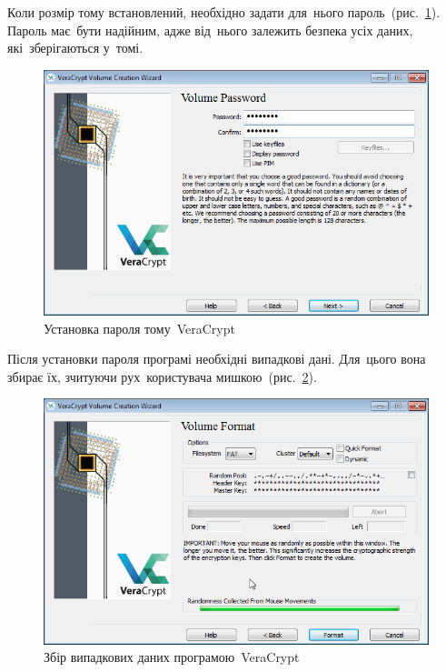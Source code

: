 \documentclass[
	a4paper,
	oneside,
	BCOR = 10mm,
	DIV = 12,
	12pt,
	headings = normal,
]{scrartcl}
\begin{document}
		Коли розмір тому встановлений, необхідно задати для~нього пароль~(рис.~\ref{fig:vc-vol-password}). Пароль має~бути надійним, адже від~нього залежить безпека усіх даних, які~зберігаються у~томі.

		\begin{figure}[!htbp]
			\centering
			\includegraphics[height = 10 \baselineskip]{./assets/07.png}
			\caption{Установка пароля тому~\textenglish{VeraCrypt}}
			\label{fig:vc-vol-password}
		\end{figure}

		Після установки пароля програмі необхідні випадкові дані. Для~цього вона збирає їх, зчитуючи рух~користувача мишкою~(рис.~\ref{fig:vc-randomness}).

		\begin{figure}[!htbp]
			\centering
			\includegraphics[height = 10 \baselineskip]{./assets/08.png}
			\caption{Збір випадкових даних програмою~\textenglish{VeraCrypt}}
			\label{fig:vc-randomness}
		\end{figure}
\end{document}
